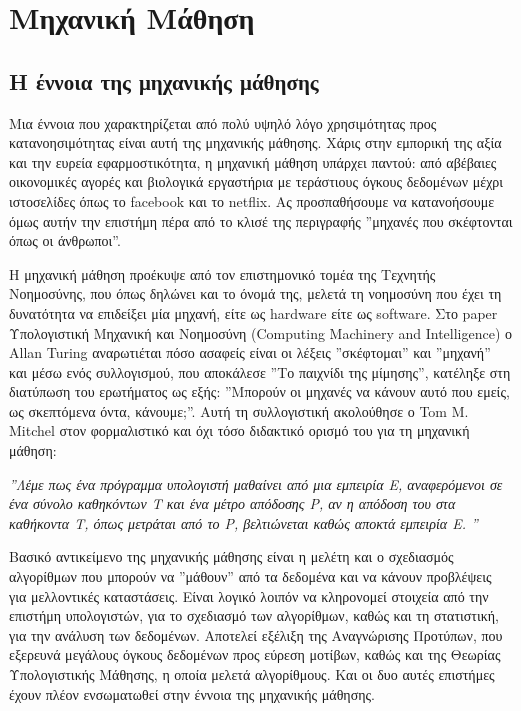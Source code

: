 \documentclass{article}
\begin{document}
\sloppy
\pagestyle{empty}
\tableofcontents
\clearpage
\listoffigures
\clearpage
\pagestyle{fancy}
\section{Μηχανική Μάθηση}
\subsection{Η έννοια της μηχανικής μάθησης}
Μια έννοια που χαρακτηρίζεται από πολύ υψηλό λόγο χρησιμότητας προς κατανοησιμότητας είναι αυτή της μηχανικής μάθησης. Χάρις στην εμπορική της αξία και την ευρεία εφαρμοστικότητα, η μηχανική μάθηση υπάρχει παντού: από αβέβαιες οικονομικές αγορές και βιολογικά εργαστήρια με τεράστιους όγκους δεδομένων μέχρι ιστοσελίδες όπως το facebook και το netflix. Ας προσπαθήσουμε να κατανοήσουμε όμως αυτήν την επιστήμη πέρα από το κλισέ της περιγραφής ”μηχανές που σκέφτονται όπως οι άνθρωποι”.

Η μηχανική μάθηση προέκυψε από τον επιστημονικό τομέα της Τεχνητής Νοημοσύνης, που όπως δηλώνει και το όνομά της, μελετά τη νοημοσύνη που έχει τη δυνατότητα να επιδείξει μία μηχανή, είτε ως hardware είτε ως software. Στο paper Υπολογιστική Μηχανική και Νοημοσύνη (Computing Machinery and Intelligence) ο Allan Turing αναρωτιέται πόσο ασαφείς είναι οι λέξεις ”σκέφτομαι” και ”μηχανή” και μέσω ενός συλλογισμού, που αποκάλεσε ”Το παιχνίδι της μίμησης”, κατέληξε στη διατύπωση του ερωτήματος ως εξής: ”Μπορούν οι μηχανές να κάνουν αυτό που εμείς, ως σκεπτόμενα όντα, κάνουμε;”. Αυτή τη συλλογιστική ακολούθησε ο Tom M. Mitchel στον φορμαλιστικό και όχι τόσο διδακτικό ορισμό του για τη μηχανική μάθηση:

\textit{”Λέμε πως ένα πρόγραμμα υπολογιστή μαθαίνει από μια εμπειρία Ε, αναφερόμενοι σε ένα σύνολο καθηκόντων Τ και ένα μέτρο απόδοσης P, αν η απόδοση του στα καθήκοντα T, όπως μετράται από το P, βελτιώνεται καθώς αποκτά εμπειρία Ε. ”}

Βασικό αντικείμενο της μηχανικής μάθησης είναι η μελέτη και ο σχεδιασμός αλγορίθμων που μπορούν να ”μάθουν” από τα δεδομένα και να κάνουν προβλέψεις για μελλοντικές καταστάσεις. Είναι λογικό λοιπόν να κληρονομεί στοιχεία από την επιστήμη υπολογιστών, για το σχεδιασμό των αλγορίθμων, καθώς και τη στατιστική, για την ανάλυση των δεδομένων. Αποτελεί εξέλιξη της Αναγνώρισης Προτύπων, που εξερευνά μεγάλους όγκους δεδομένων προς εύρεση μοτίβων, καθώς και της Θεωρίας Υπολογιστικής Μάθησης, η οποία μελετά αλγορίθμους. Και οι δυο αυτές επιστήμες έχουν πλέον ενσωματωθεί στην έννοια της μηχανικής μάθησης.
\end{document}
